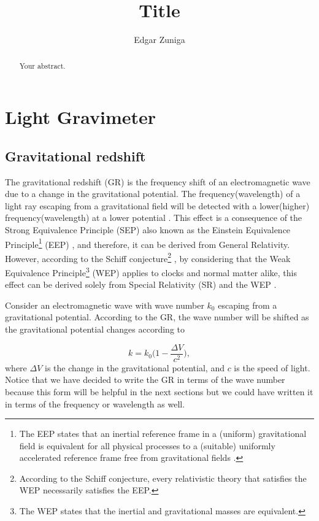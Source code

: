\documentclass{article}
\title{Title}
\author{Edgar Zuniga}
\begin{document}
\maketitle
\tableofcontents

\begin{abstract}
Your abstract.
\end{abstract}

\section{Light Gravimeter}
\subsection{Gravitational redshift}
The gravitational redshift (GR) is the frequency shift of an electromagnetic wave due to a change in the gravitational potential. The frequency(wavelength) of a light ray escaping from a gravitational field will be detected with a lower(higher) frequency(wavelength) at a lower potential \cite{Cheng2004-tw}. This effect is a consequence of the Strong Equivalence Principle (SEP) also known as the Einstein Equivalence Principle\footnote{The EEP states that an inertial reference frame in a (uniform) gravitational field is equivalent for all physical processes to a (suitable) uniformly accelerated reference frame free from gravitational fields \cite{Nobili-2013, michael2016}.} (EEP) \cite{Nobili-2013}, and therefore, it can be derived from General Relativity. However, according to the Schiff conjecture\footnote{According to the Schiff conjecture, every relativistic theory that satisfies the WEP necessarily satisfies the EEP.} \cite{coley-1982}, by considering that the Weak Equivalence Principle\footnote{The WEP states that the inertial and gravitational masses are equivalent.} (WEP) applies to clocks and normal matter alike, this effect can be derived solely from Special Relativity (SR) and the WEP \cite{Nobili-2013}.

Consider an electromagnetic wave with wave number $k_{0}$ escaping from a gravitational potential. According to the GR, the wave number will be shifted as the gravitational potential changes according to \cite{Cheng2004-tw}

\begin{equation}
    k = k_{0}\bigg(1 - \frac{\Delta V}{c^{2}}\bigg),
\end{equation}
%
where $\Delta V$ is the change in the gravitational potential, and $c$ is the speed of light. Notice that we have decided to write the GR in terms of the wave number because this form will be helpful in the next sections but we could have written it in terms of the frequency or wavelength as well.
\end{document}
